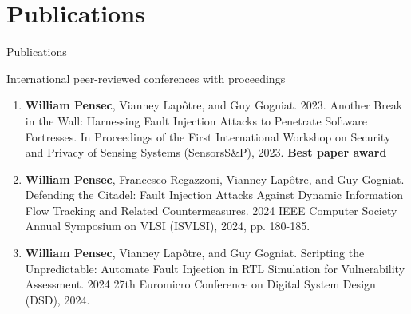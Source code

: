 \section*{Publications}

\begin{frame}[allowframebreaks]{Publications}
    \begin{block}{International peer-reviewed conferences with proceedings}
        \begin{enumerate}
            \item {\footnotesize\textbf{William Pensec}, Vianney Lapôtre, and Guy Gogniat. 2023. Another Break in the Wall: Harnessing Fault Injection Attacks to Penetrate Software Fortresses. In Proceedings of the First International Workshop on Security and Privacy of Sensing Systems (SensorsS\&P), 2023. \textbf{Best paper award}~\cite{PLG-23-SensorsSP}}
            \item {\footnotesize\textbf{William Pensec}, Francesco Regazzoni, Vianney Lapôtre, and Guy Gogniat. Defending the Citadel: Fault Injection Attacks Against Dynamic Information Flow Tracking and Related Countermeasures. 2024 IEEE Computer Society Annual Symposium on VLSI (ISVLSI), 2024, pp. 180-185.~\cite{PRLG-24-isvlsi}}
            \item {\footnotesize\textbf{William Pensec}, Vianney Lapôtre, and Guy Gogniat. Scripting the Unpredictable: Automate Fault Injection in RTL Simulation for Vulnerability Assessment. 2024 27th Euromicro Conference on Digital System Design (DSD), 2024.~\cite{PLG-24-dsd}}
        \end{enumerate}
    \end{block}



\end{frame}

